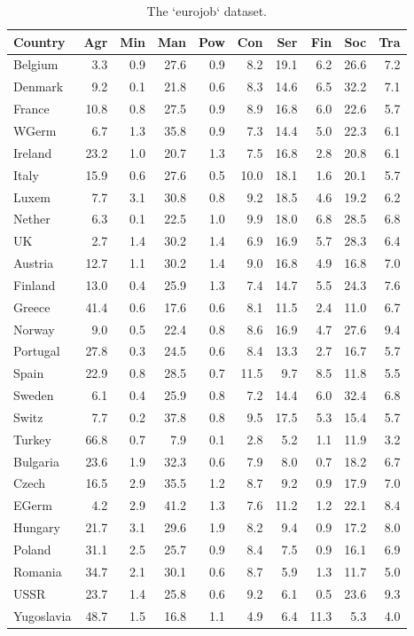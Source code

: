 \documentclass[]{book}
\begin{document}
\begin{longtable}[t]{lrrrrrrrrr}
\caption{\label{tab:eurotable}The `eurojob` dataset.}\\
\toprule
Country & Agr & Min & Man & Pow & Con & Ser & Fin & Soc & Tra\\
\midrule
Belgium & 3.3 & 0.9 & 27.6 & 0.9 & 8.2 & 19.1 & 6.2 & 26.6 & 7.2\\
Denmark & 9.2 & 0.1 & 21.8 & 0.6 & 8.3 & 14.6 & 6.5 & 32.2 & 7.1\\
France & 10.8 & 0.8 & 27.5 & 0.9 & 8.9 & 16.8 & 6.0 & 22.6 & 5.7\\
WGerm & 6.7 & 1.3 & 35.8 & 0.9 & 7.3 & 14.4 & 5.0 & 22.3 & 6.1\\
Ireland & 23.2 & 1.0 & 20.7 & 1.3 & 7.5 & 16.8 & 2.8 & 20.8 & 6.1\\
\addlinespace
Italy & 15.9 & 0.6 & 27.6 & 0.5 & 10.0 & 18.1 & 1.6 & 20.1 & 5.7\\
Luxem & 7.7 & 3.1 & 30.8 & 0.8 & 9.2 & 18.5 & 4.6 & 19.2 & 6.2\\
Nether & 6.3 & 0.1 & 22.5 & 1.0 & 9.9 & 18.0 & 6.8 & 28.5 & 6.8\\
UK & 2.7 & 1.4 & 30.2 & 1.4 & 6.9 & 16.9 & 5.7 & 28.3 & 6.4\\
Austria & 12.7 & 1.1 & 30.2 & 1.4 & 9.0 & 16.8 & 4.9 & 16.8 & 7.0\\
\addlinespace
Finland & 13.0 & 0.4 & 25.9 & 1.3 & 7.4 & 14.7 & 5.5 & 24.3 & 7.6\\
Greece & 41.4 & 0.6 & 17.6 & 0.6 & 8.1 & 11.5 & 2.4 & 11.0 & 6.7\\
Norway & 9.0 & 0.5 & 22.4 & 0.8 & 8.6 & 16.9 & 4.7 & 27.6 & 9.4\\
Portugal & 27.8 & 0.3 & 24.5 & 0.6 & 8.4 & 13.3 & 2.7 & 16.7 & 5.7\\
Spain & 22.9 & 0.8 & 28.5 & 0.7 & 11.5 & 9.7 & 8.5 & 11.8 & 5.5\\
\addlinespace
Sweden & 6.1 & 0.4 & 25.9 & 0.8 & 7.2 & 14.4 & 6.0 & 32.4 & 6.8\\
Switz & 7.7 & 0.2 & 37.8 & 0.8 & 9.5 & 17.5 & 5.3 & 15.4 & 5.7\\
Turkey & 66.8 & 0.7 & 7.9 & 0.1 & 2.8 & 5.2 & 1.1 & 11.9 & 3.2\\
Bulgaria & 23.6 & 1.9 & 32.3 & 0.6 & 7.9 & 8.0 & 0.7 & 18.2 & 6.7\\
Czech & 16.5 & 2.9 & 35.5 & 1.2 & 8.7 & 9.2 & 0.9 & 17.9 & 7.0\\
\addlinespace
EGerm & 4.2 & 2.9 & 41.2 & 1.3 & 7.6 & 11.2 & 1.2 & 22.1 & 8.4\\
Hungary & 21.7 & 3.1 & 29.6 & 1.9 & 8.2 & 9.4 & 0.9 & 17.2 & 8.0\\
Poland & 31.1 & 2.5 & 25.7 & 0.9 & 8.4 & 7.5 & 0.9 & 16.1 & 6.9\\
Romania & 34.7 & 2.1 & 30.1 & 0.6 & 8.7 & 5.9 & 1.3 & 11.7 & 5.0\\
USSR & 23.7 & 1.4 & 25.8 & 0.6 & 9.2 & 6.1 & 0.5 & 23.6 & 9.3\\
Yugoslavia & 48.7 & 1.5 & 16.8 & 1.1 & 4.9 & 6.4 & 11.3 & 5.3 & 4.0\\
\bottomrule
\end{longtable}
\end{document}
